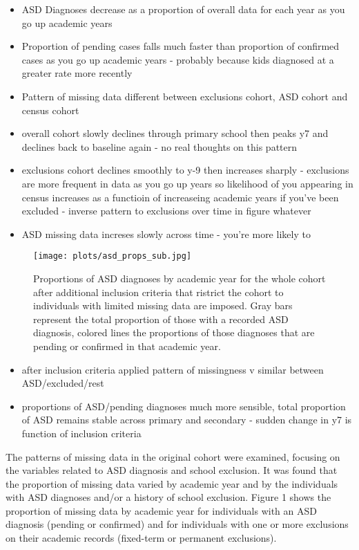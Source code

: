 \documentclass[
]{article}
\providecommand{\tightlist}{%
  \setlength{\itemsep}{0pt}\setlength{\parskip}{0pt}}
\begin{document}
\begin{itemize}
\tightlist
\item
  ASD Diagnoses decrease as a proportion of overall data for each year
  as you go up academic years
\item
  Proportion of pending cases falls much faster than proportion of
  confirmed cases as you go up academic years - probably because kids
  diagnosed at a greater rate more recently
\item
  Pattern of missing data different between exclusions cohort, ASD
  cohort and census cohort
\item
  overall cohort slowly declines through primary school then peaks y7
  and declines back to baseline again - no real thoughts on this pattern
\item
  exclusions cohort declines smoothly to y-9 then increases sharply -
  exclusions are more frequent in data as you go up years so likelihood
  of you appearing in census increases as a functioin of increaseing
  academic years if you've been excluded - inverse pattern to exclusions
  over time in figure whatever
\item
  ASD missing data increses slowly across time - you're more likely to
\end{itemize}

\begin{figure}[H]
\centering
\texttt{[image: plots/asd\_props\_sub.jpg]}
\caption{Proportions of ASD diagnoses by academic year for the whole cohort after additional inclusion criteria that ristrict the cohort to individuals with limited missing data are imposed. Gray bars represent the total proportion of those with a recorded ASD diagnosis, colored lines the proportions of those diagnoses that are pending or confirmed in that academic year.}
\label{fig:asd_props_sub}
\end{figure}

\begin{itemize}
\tightlist
\item
  after inclusion criteria applied pattern of missingness v similar
  between ASD/excluded/rest
\item
  proportions of ASD/pending diagnoses much more sensible, total
  proportion of ASD remains stable across primary and secondary - sudden
  change in y7 is function of inclusion criteria
\end{itemize}

The patterns of missing data in the original cohort were examined,
focusing on the variables related to ASD diagnosis and school exclusion.
It was found that the proportion of missing data varied by academic year
and by the individuals with ASD diagnoses and/or a history of school
exclusion. Figure 1 shows the proportion of missing data by academic
year for individuals with an ASD diagnosis (pending or confirmed) and
for individuals with one or more exclusions on their academic records
(fixed-term or permanent exclusions).
\end{document}
